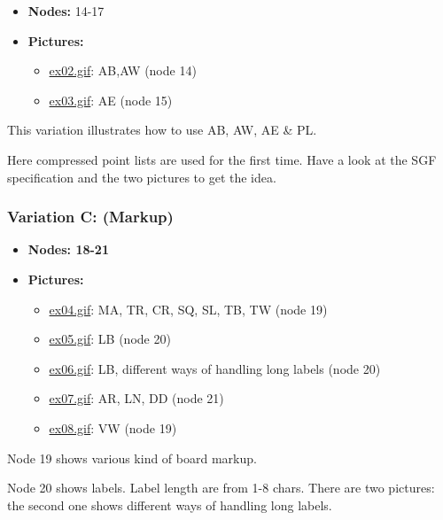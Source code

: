 \begin{itemize}
\item
  \textbf{Nodes:} 14-17
\item
  \textbf{Pictures:}

  \begin{itemize}
  \item
    \href{https://red-bean.com/sgf/examples/ex02.gif}{ex02.gif}: AB,AW
    (node 14)
  \item
    \href{https://red-bean.com/sgf/examples/ex03.gif}{ex03.gif}: AE
    (node 15)
  \end{itemize}
\end{itemize}

This variation illustrates how to use AB, AW, AE \& PL.

Here compressed point lists are used for the first time. Have a look at
the SGF specification and the two pictures to get the idea.

\subsubsection{Variation C: (Markup)}\label{variation-c-markup}

\begin{itemize}
\tightlist
\item
  \textbf{Nodes: 18-21}
\item
  \textbf{Pictures:}

  \begin{itemize}
  \item
    \href{https://red-bean.com/sgf/examples/ex04.gif}{ex04.gif}: MA, TR,
    CR, SQ, SL, TB, TW (node 19)
  \item
    \href{https://red-bean.com/sgf/examples/ex05.gif}{ex05.gif}: LB
    (node 20)
  \item
    \href{https://red-bean.com/sgf/examples/ex06.gif}{ex06.gif}: LB,
    different ways of handling long labels (node 20)
  \item
    \href{https://red-bean.com/sgf/examples/ex07.gif}{ex07.gif}: AR, LN,
    DD (node 21)
  \item
    \href{https://red-bean.com/sgf/examples/ex08.gif}{ex08.gif}: VW
    (node 19)
  \end{itemize}
\end{itemize}

Node 19 shows various kind of board markup.

Node 20 shows labels. Label length are from 1-8 chars. There are two
pictures: the second one shows different ways of handling long labels.

